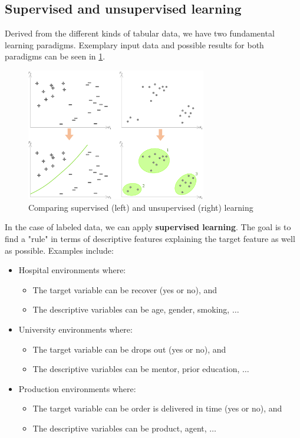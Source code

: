 \subsection{Supervised and unsupervised learning}
Derived from the different kinds of tabular data, we have two fundamental learning paradigms. Exemplary input data and possible results for both paradigms can be seen in \ref{fig:1_sv_vs_usv}.

\begin{figure}[h]
  \centering
  \includegraphics[width=0.7\textwidth]{assets/basics/SV_vs_US.png}
  \caption{Comparing supervised (left) and unsupervised (right) learning}
  \label{fig:1_sv_vs_usv}
\end{figure}

In the case of labeled data, we can apply \textbf{supervised learning}. The goal is to find a "rule" in terms of descriptive features explaining the target feature as well as possible. Examples include:
\begin{itemize}
  \item Hospital environments where:
  \begin{itemize}
    \item The target variable can be {\color{ForestGreen}recover (yes or no)}, and 
    \item The descriptive variables can be {\color{ForestGreen}age, gender, smoking, $\dots$}
  \end{itemize}
  \item University environments where:
  \begin{itemize}
    \item The target variable can be {\color{ForestGreen}drops out (yes or no)}, and 
    \item The descriptive variables can be {\color{ForestGreen}mentor, prior education, $\dots$}
  \end{itemize}
  \item Production environments where:
  \begin{itemize}
    \item The target variable can be {\color{ForestGreen}order is delivered in time (yes or no)}, and 
    \item The descriptive variables can be {\color{ForestGreen}product, agent, $\dots$}
  \end{itemize}
\end{itemize}

